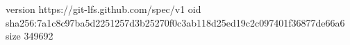 version https://git-lfs.github.com/spec/v1
oid sha256:7a1c8c97ba5d2251257d3b25270f0c3ab118d25ed19c2c097401f36877de66a6
size 349692

